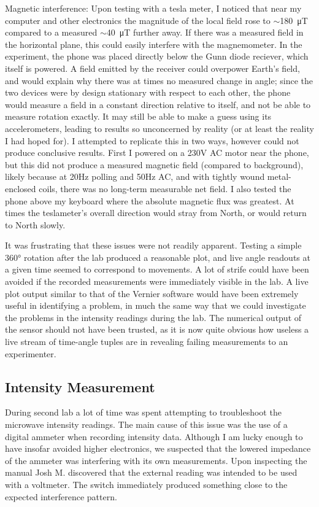 Magnetic interference:
Upon testing with a tesla meter, I noticed that near my computer and other electronics the magnitude of the local field rose to 
$\sim$\SI{180}{\micro\tesla} compared to a measured $\sim$\SI{40}{\micro\tesla} further away. If there was a measured field in the horizontal plane, this could easily interfere with the magnemometer. In the experiment, the phone was placed directly below the Gunn diode reciever, which itself is powered. A field emitted by the receiver could overpower Earth's field, and would explain why there was at times no measured change in angle; since the two devices were by design stationary with respect to each other, the phone would measure a field in a constant direction relative to itself, and not be able to measure rotation exactly. It may still be able to make a guess using its accelerometers, leading to results so unconcerned by reality (or at least the reality I had hoped for).
I attempted to replicate this in two ways, however could not produce conclusive results. First I powered on a 230V AC motor near the phone, but this did not produce a measured magnetic field (compared to background), likely because at 20Hz polling and 50Hz AC, and with tightly wound metal-enclosed coils, there was no long-term measurable net field. I also tested the phone above my keyboard where the absolute magnetic flux was greatest. At times the teslameter's overall direction would stray from North, or would return to North slowly. 

It was frustrating that these issues were not readily apparent. Testing a simple 360° rotation after the lab produced a reasonable plot, and live angle readouts at a given time seemed to correspond to movements.
A lot of strife could have been avoided if the recorded measurements were immediately visible in the lab. A live plot output similar to that of the Vernier software would have been extremely useful in identifying a problem, in much the same way that we could investigate the problems in the intensity readings during the lab. The numerical output of the sensor should not have been trusted, as it is now quite obvious how useless a live stream of time-angle tuples are in revealing failing measurements to an experimenter.

\subsection*{Intensity Measurement}

During second lab a lot of time was spent attempting to troubleshoot the microwave intensity readings. The main cause of this issue was the use of a digital ammeter when recording intensity data. Although I am lucky enough to have insofar avoided higher electronics, we suspected that the lowered impedance of the ammeter was interfering with its own measurements. Upon inspecting the manual Josh M. discovered that the external reading was intended to be used with a voltmeter. The switch immediately produced something close to the expected interference pattern.

